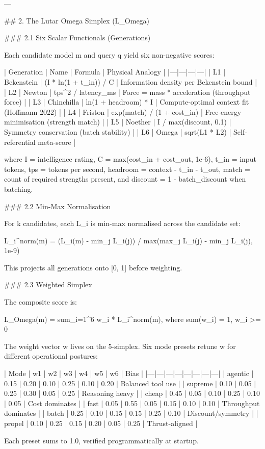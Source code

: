 ---

## 2. The Lutar Omega Simplex (L_Omega)

### 2.1 Six Scalar Functionals (Generations)

Each candidate model m and query q yield six non-negative scores:

| Generation | Name | Formula | Physical Analogy |
|---|---|---|---|
| L1 | Bekenstein | (I * ln(1 + t_in)) / C | Information density per Bekenstein bound |
| L2 | Newton | tps^2 / latency_ms | Force = mass * acceleration (throughput force) |
| L3 | Chinchilla | ln(1 + headroom) * I | Compute-optimal context fit (Hoffmann 2022) |
| L4 | Friston | exp(match) / (1 + cost_in) | Free-energy minimisation (strength match) |
| L5 | Noether | I / max(discount, 0.1) | Symmetry conservation (batch stability) |
| L6 | Omega | sqrt(L1 * L2) | Self-referential meta-score |

where I = intelligence rating, C = max(cost_in + cost_out, 1e-6), t_in = input tokens, tps = tokens per second, headroom = context - t_in - t_out, match = count of required strengths present, and discount = 1 - batch_discount when batching.

### 2.2 Min-Max Normalisation

For k candidates, each L_i is min-max normalised across the candidate set:

L_i^norm(m) = (L_i(m) - min_j L_i(j)) / max(max_j L_i(j) - min_j L_i(j), 1e-9)

This projects all generations onto [0, 1] before weighting.

### 2.3 Weighted Simplex

The composite score is:

L_Omega(m) = sum_{i=1}^{6} w_i * L_i^norm(m), where sum(w_i) = 1, w_i >= 0

The weight vector w lives on the 5-simplex. Six mode presets retune w for different operational postures:

| Mode | w1 | w2 | w3 | w4 | w5 | w6 | Bias |
|---|---|---|---|---|---|---|---|
| agentic | 0.15 | 0.20 | 0.10 | 0.25 | 0.10 | 0.20 | Balanced tool use |
| supreme | 0.10 | 0.05 | 0.25 | 0.30 | 0.05 | 0.25 | Reasoning heavy |
| cheap | 0.45 | 0.05 | 0.10 | 0.25 | 0.10 | 0.05 | Cost dominates |
| fast | 0.05 | 0.55 | 0.05 | 0.15 | 0.10 | 0.10 | Throughput dominates |
| batch | 0.25 | 0.10 | 0.15 | 0.15 | 0.25 | 0.10 | Discount/symmetry |
| propel | 0.10 | 0.25 | 0.15 | 0.20 | 0.05 | 0.25 | Thrust-aligned |

Each preset sums to 1.0, verified programmatically at startup.


